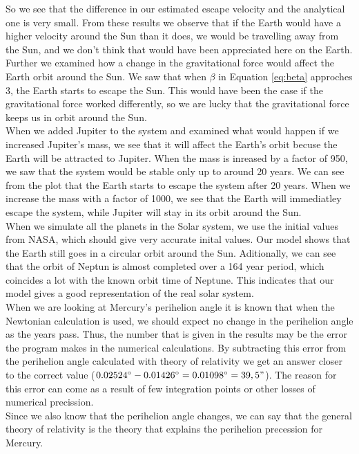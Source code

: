 \documentclass{article}
\begin{document}
    So we see that the difference in our estimated escape velocity and the analytical one is very small. From these results we observe that if the Earth would have a higher velocity around the Sun than it does, we would be travelling away from the Sun, and we don't think that would have been appreciated here on the Earth.\\

    Further we examined how a change in the gravitational force would affect the Earth orbit around the Sun. We saw that when $\beta$ in Equation \ref{eq:beta} approches 3, the Earth starts to escape the Sun. This would have been the case if the gravitational force worked differently, so we are lucky that the gravitational force keeps us in orbit around the Sun.\\

    When we added Jupiter to the system and examined what would happen if we increased Jupiter's mass, we see that it will affect the Earth's orbit becuse the Earth will be attracted to Jupiter. When the mass is inreased by a factor of 950, we saw that the system would be stable only up to around 20 years. We can see from the plot that the Earth starts to escape the system after 20 years. When we increase the mass with a factor of 1000, we see that the Earth will immediatley escape the system, while Jupiter will stay in its orbit around the Sun.\\

    When we simulate all the planets in the Solar system, we use the initial values from NASA, which should give very accurate inital values. Our model shows that the Earth still goes in a circular orbit around the Sun. Aditionally, we can see that the orbit of Neptun is almost completed over a 164 year period, which coincides a lot with the known orbit time of Neptune. This indicates that our model gives a good representation of the real solar system.\\

    When we are looking at Mercury's perihelion angle it is known that when the Newtonian calculation is used, we should expect no change in the perihelion angle as the years pass. Thus, the number that is given in the results may be the error the program makes in the numerical calculations. By subtracting this error from the perihelion angle calculated with theory of relativity we get an answer closer to the correct value ($0.02524^\circ - 0.01426^\circ = 0.01098^\circ = 39,5" $). The reason for this error can come as a result of few integration points or other losses of numerical precission. \\
    Since we also know that the perihelion angle changes, we can say that the general theory of relativity is the theory that explains the perihelion precession for Mercury.
\end{document}
